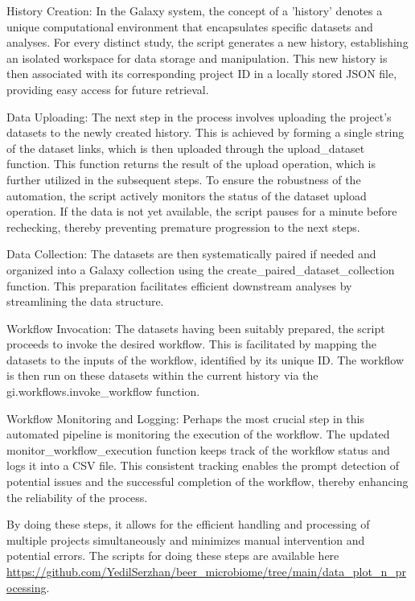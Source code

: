             History Creation: In the Galaxy system, the concept of a 'history' denotes a unique computational environment that encapsulates specific datasets and analyses. For every distinct study, the script generates a new history, establishing an isolated workspace for data storage and manipulation. This new history is then associated with its corresponding project ID in a locally stored JSON file, providing easy access for future retrieval.
            
            Data Uploading: The next step in the process involves uploading the project's datasets to the newly created history. This is achieved by forming a single string of the dataset links, which is then uploaded through the upload\_dataset function. This function returns the result of the upload operation, which is further utilized in the subsequent steps. To ensure the robustness of the automation, the script actively monitors the status of the dataset upload operation. If the data is not yet available, the script pauses for a minute before rechecking, thereby preventing premature progression to the next steps.
            
            Data Collection: The datasets are then systematically paired if needed and organized into a Galaxy collection using the create\_paired\_dataset\_collection function. This preparation facilitates efficient downstream analyses by streamlining the data structure.
            
            Workflow Invocation: The datasets having been suitably prepared, the script proceeds to invoke the desired workflow. This is facilitated by mapping the datasets to the inputs of the workflow, identified by its unique ID. The workflow is then run on these datasets within the current history via the gi.workflows.invoke\_workflow function.
            
            Workflow Monitoring and Logging: Perhaps the most crucial step in this automated pipeline is monitoring the execution of the workflow. The updated monitor\_workflow\_execution function keeps track of the workflow status and logs it into a CSV file. This consistent tracking enables the prompt detection of potential issues and the successful completion of the workflow, thereby enhancing the reliability of the process.
            
            By doing these steps, it allows for the efficient handling and processing of multiple projects simultaneously and minimizes manual intervention and potential errors. The scripts for doing these steps are available here \url{https://github.com/YedilSerzhan/beer_microbiome/tree/main/data_plot_n_processing}.


